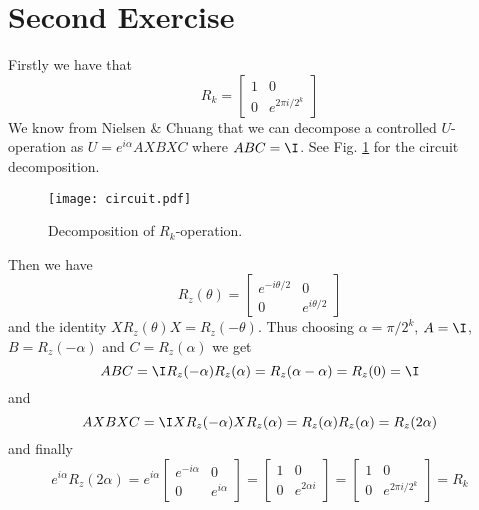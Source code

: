 \section{Second Exercise}
Firstly we have that
\begin{equation}
    R_k = 
    \begin{bmatrix}
        1 & 0\\
        0 & e^{2\pi i / 2^k}
    \end{bmatrix}
\end{equation}
We know from Nielsen \& Chuang that we can decompose a controlled $U$-operation as $U = e^{i\alpha}AXBXC$ where $ABC = \I$. See Fig. \ref{fig:rk} for the circuit decomposition.
\begin{figure}[H]
    \centering
    \texttt{[image: circuit.pdf]}
    \caption{Decomposition of $R_k$-operation.}\label{fig:rk}
\end{figure}
Then we have 
\begin{equation}
    R_z(\theta) = 
    \begin{bmatrix}
        e^{-i \theta /2} & 0\\
        0 & e^{i \theta /2}
    \end{bmatrix}
\end{equation}
and the identity $XR_z(\theta)X = R_z(-\theta)$. Thus choosing $\alpha = \pi / 2^k$, $A = \I$, $B = R_z(-\alpha)$ and $C = R_z(\alpha)$ we get
\begin{equation}
    A B C = \I R_z(-\alpha) R_z(\alpha) = R_z(\alpha -\alpha) = R_z(0) = \I
\end{equation}
and
\begin{equation}
    A X B X C = \I X R_z(-\alpha) X R_z(\alpha) = R_z(\alpha)R_z(\alpha) = R_z(2\alpha)
\end{equation}
and finally
\begin{equation}
    e^{i\alpha} R_z(2\alpha) = e^{i\alpha}
    \begin{bmatrix}
        e^{-i\alpha} & 0\\
        0 & e^{i\alpha}
    \end{bmatrix}
    =
    \begin{bmatrix}
        1 & 0\\
        0 & e^{2\alpha i}
    \end{bmatrix}
    =
    \begin{bmatrix}
        1 & 0\\
        0 & e^{2\pi i/ 2^k}
    \end{bmatrix}
    = R_k
\end{equation}